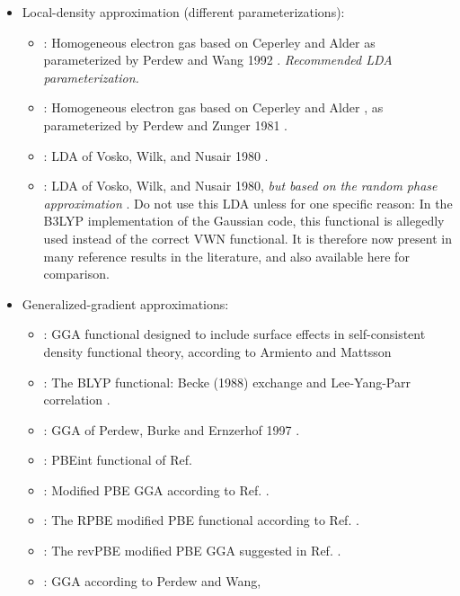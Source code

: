 \begin{itemize}
  \item Local-density approximation (different parameterizations):
    \begin{itemize}
      \item {} : Homogeneous electron gas based on Ceperley and
        Alder \cite{Cep80} as parameterized by Perdew and Wang 1992
        \cite{Per92}. \emph{Recommended LDA parameterization.}
      \item {} : Homogeneous electron gas based on Ceperley and
         Alder \cite{Cep80}, as parameterized by Perdew and Zunger 1981
         \cite{Per81}.
      \item {} : LDA of Vosko, Wilk, and Nusair 1980 \cite{Vosko80}.
      \item {} : LDA of Vosko, Wilk, and Nusair 1980, \emph{but
        based on the random phase approximation} \cite{Scuseria05}. Do
        not use this LDA unless for one specific reason: In the B3LYP
        implementation of the Gaussian code, this functional is allegedly
        used instead of the correct VWN functional. It is therefore now
        present in many reference results in the literature, and also
        available here for comparison.
    \end{itemize}
  \item Generalized-gradient approximations:
    \begin{itemize}
      \item {} : GGA functional designed to include surface effects
    in self-consistent density functional theory, according to Armiento
    and Mattsson \cite{AM05}
      \item {} : The BLYP functional: Becke (1988) exchange
      \cite{Becke88b} and Lee-Yang-Parr correlation \cite{Lee88}.
      \item {} : GGA of Perdew, Burke and Ernzerhof 1997 \cite{Per97}.
      \item {} : PBEint functional of Ref. \cite{Fabiano10}
      \item {} : Modified PBE GGA according to Ref. \cite{Perdew08}.
      \item {} : The RPBE modified PBE functional according to
        Ref. \cite{Hammer99}.
      \item {} : The revPBE modified PBE GGA suggested in
        Ref. \cite{Zhang98}.
      \item {} : GGA according to Perdew and Wang,

\end{itemize}
\end{itemize}
